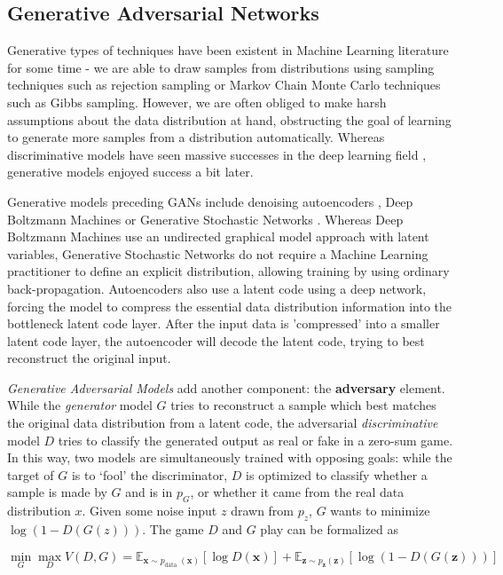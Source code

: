 \documentclass{article}
\begin{document}
\subsection{Generative Adversarial Networks}\label{sec:GANs}
Generative types of techniques have been existent in Machine Learning literature for some time - we are able to draw samples from distributions using sampling techniques such as rejection sampling or Markov Chain Monte Carlo techniques such as Gibbs sampling. However, we are often obliged to make harsh assumptions about the data distribution at hand, obstructing the goal of learning to generate more samples from a distribution automatically. Whereas discriminative models have seen massive successes in the deep learning field \cite{hinton2012deep}, generative models enjoyed success a bit later.

Generative models preceding GANs include denoising autoencoders \cite{lu2013speech}, Deep Boltzmann Machines \cite{salakhutdinov2009deep} or Generative Stochastic Networks \cite{bengio2014deep}. Whereas Deep Boltzmann Machines use an undirected graphical model approach with latent variables, Generative Stochastic Networks do not require a Machine Learning practitioner to define an explicit distribution, allowing training by using ordinary back-propagation. Autoencoders also use a latent code using a deep network, forcing the model to compress the essential data distribution information into the bottleneck latent code layer. After the input data is 'compressed' into a smaller latent code layer, the autoencoder will decode the latent code, trying to best reconstruct the original input.

\textit{Generative Adversarial Models} \cite{goodfellow2014generative} add another component: the \textbf{adversary} element. While the \emph{generator} model $G$ tries to reconstruct a sample which best matches the original data distribution from a latent code, the adversarial \emph{discriminative} model $D$ tries to classify the generated output as real or fake in a zero-sum game. In this way, two models are simultaneously trained with opposing goals: while the target of $G$ is to `fool' the discriminator, $D$ is optimized to classify whether a sample is made by $G$ and is in $p_G$, or whether it came from the real data distribution $x$. Given some noise input $z$ drawn from $p_z$, $G$ wants to minimize $\log(1-D(G(z)))$. The game $D$ and $G$ play can be formalized as

\begin{equation}\label{gan-objective-function}
\min _{G} \max _{D} V(D, G) = \mathbb{E}_{\boldsymbol{x} \sim p_{\text {data }}(\boldsymbol{x})}[\log D(\boldsymbol{x})]+\mathbb{E}_{\boldsymbol{z} \sim p_{\boldsymbol{z}}(\boldsymbol{z})}[\log (1-D(G(\boldsymbol{z})))]
\end{equation}
\end{document}
